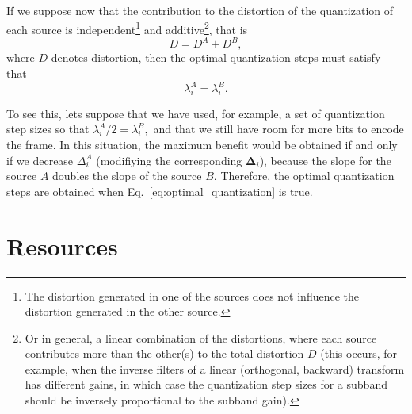 If we suppose now that the contribution to the distortion of the
quantization of each source is independent\footnote{The distortion
generated in one of the sources does not influence the distortion
generated in the other source.} and additive\footnote{Or in general, a
linear combination of the distortions, where each source contributes
more than the other(s) to the total distortion $D$ (this occurs, for
example, when the inverse filters of a linear (orthogonal, backward)
transform has different gains, in which case the quantization step
sizes for a subband should be inversely proportional to the subband
gain).}, that is
\begin{equation}
  D = D^A + D^B,
  \label{eq:additive}
\end{equation}
where $D$ denotes distortion, then the optimal quantization steps must
satisfy that~\cite{vetterli1995wavelets,sayood2017introduction}
\begin{equation}
  \lambda^A_i = \lambda^B_i.
  \label{eq:optimal_quantization}
\end{equation}

To see this, lets suppose that we have used, for example, a set of
quantization step sizes so that $\lambda^A_i/2 = \lambda^B_i,$ and
that we still have room for more bits to encode the frame. In this
situation, the maximum benefit would be obtained if and only if we
decrease $\Delta^A_i$ (modifiying the corresponding
$\mathbf{\Delta}_i$), because the slope for the source $A$ doubles
the slope of the source $B$. Therefore, the optimal quantization
steps are obtained when Eq.~\ref{eq:optimal_quantization} is
true.

\section{Resources}
\renewcommand{\addcontentsline}[3]{}%

